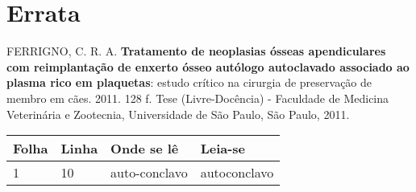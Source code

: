 \chapter*{Errata}

FERRIGNO, C. R. A. \textbf{Tratamento de neoplasias ósseas apendiculares com
    reimplantação de enxerto ósseo autólogo autoclavado associado ao plasma
    rico em plaquetas}: estudo crítico na cirurgia de preservação de membro em
cães. 2011. 128 f. Tese (Livre-Docência) - Faculdade de Medicina Veterinária e
Zootecnia, Universidade de São Paulo, São Paulo, 2011.

\begin{table}[htb]
    \center
    \footnotesize
    \begin{tabular}{|p{1.4cm}|p{1cm}|p{3cm}|p{3cm}|}
        \hline
        \textbf{Folha} & \textbf{Linha} & \textbf{Onde se lê} & \textbf{Leia-se} \\
        \hline
        1              & 10             & auto-conclavo       & autoconclavo     \\
        \hline
    \end{tabular}
\end{table}